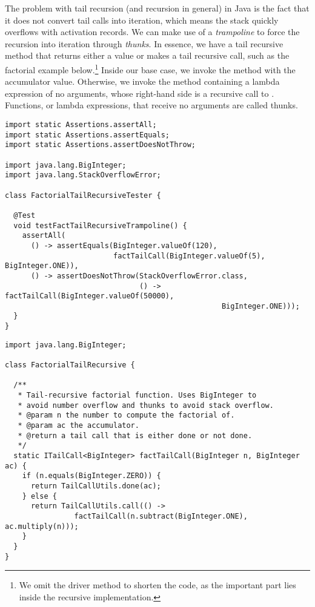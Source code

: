 The problem with tail recursion (and recursion in general) in Java is the fact that it does not convert tail calls into iteration, which means the stack quickly overflows with activation records. We can make use of a \emph{trampoline} to force the recursion into iteration through \emph{thunks}. In essence, we have a tail recursive method that returns either a value or makes a tail recursive call, such as the factorial example below.\footnote{We omit the driver method to shorten the code, as the important part lies inside the recursive implementation.} Inside our base case, we invoke the  method with the accumulator value. Otherwise, we invoke the  method containing a lambda expression of no arguments, whose right-hand side is a recursive call to . Functions, or lambda expressions, that receive no arguments are called thunks.

\enlargethispage{2\baselineskip}
\begin{lstlisting}[language=MyJava]
import static Assertions.assertAll;
import static Assertions.assertEquals;
import static Assertions.assertDoesNotThrow;

import java.lang.BigInteger;
import java.lang.StackOverflowError;

class FactorialTailRecursiveTester {
  
  @Test 
  void testFactTailRecursiveTrampoline() {
    assertAll(
      () -> assertEquals(BigInteger.valueOf(120), 
                         factTailCall(BigInteger.valueOf(5), BigInteger.ONE)),
      () -> assertDoesNotThrow(StackOverflowError.class,
                               () -> factTailCall(BigInteger.valueOf(50000), 
                                                  BigInteger.ONE)));
  }
}
\end{lstlisting}

\newpage %
\begin{lstlisting}[language=MyJava]
import java.lang.BigInteger;

class FactorialTailRecursive {
 
  /**
   * Tail-recursive factorial function. Uses BigInteger to 
   * avoid number overflow and thunks to avoid stack overflow.
   * @param n the number to compute the factorial of.
   * @param ac the accumulator.
   * @return a tail call that is either done or not done.
   */
  static ITailCall<BigInteger> factTailCall(BigInteger n, BigInteger ac) {
    if (n.equals(BigInteger.ZERO)) { 
      return TailCallUtils.done(ac); 
    } else {
      return TailCallUtils.call(() -> 
                factTailCall(n.subtract(BigInteger.ONE), ac.multiply(n)));
    }
  }
}
\end{lstlisting}

